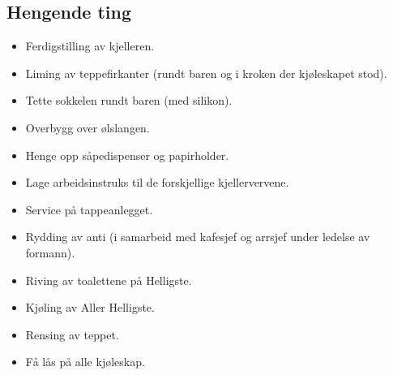\subsection{Hengende ting}
\begin{itemize}
\item Ferdigstilling av kjelleren.
\item Liming av teppefirkanter (rundt baren og i kroken der kjøleskapet stod).
\item Tette sokkelen rundt baren (med silikon).
\item Overbygg over ølslangen.
\item Henge opp såpedispenser og papirholder.
\item Lage arbeidsinstruks til de forskjellige kjellervervene.
\item Service på tappeanlegget.
\item Rydding av anti (i samarbeid med kafesjef og arrsjef under ledelse av formann).
\item Riving av toalettene på Helligste.
\item Kjøling av Aller Helligste.
\item Rensing av teppet.
\item Få lås på alle kjøleskap.
\end{itemize}
